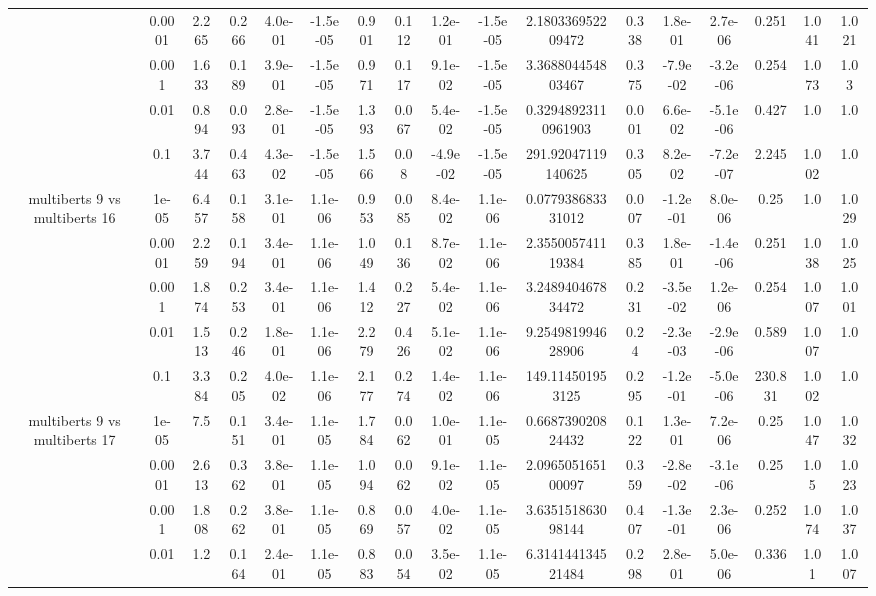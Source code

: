 \begin{tabular}{|c|c|c|c|c|c|c|c|c|c|c|c|c|c|c|c|c|}
 & 0.0001 & 2.265 & 0.266 & 4.0e-01 & -1.5e-05 & 0.901 & 0.112 & 1.2e-01 & -1.5e-05 & 2.180336952209472 & 0.338 & 1.8e-01 & 2.7e-06 & 0.251 & 1.041 & 1.021 \\
 & 0.001 & 1.633 & 0.189 & 3.9e-01 & -1.5e-05 & 0.971 & 0.117 & 9.1e-02 & -1.5e-05 & 3.368804454803467 & 0.375 & -7.9e-02 & -3.2e-06 & 0.254 & 1.073 & 1.03 \\
 & 0.01 & 0.894 & 0.093 & 2.8e-01 & -1.5e-05 & 1.393 & 0.067 & 5.4e-02 & -1.5e-05 & 0.32948923110961903 & 0.001 & 6.6e-02 & -5.1e-06 & 0.427 & 1.0 & 1.0 \\
 & 0.1 & 3.744 & 0.463 & 4.3e-02 & -1.5e-05 & 1.566 & 0.08 & -4.9e-02 & -1.5e-05 & 291.92047119140625 & 0.305 & 8.2e-02 & -7.2e-07 & 2.245 & 1.002 & 1.0 \\
\hline
\multirow{5}{*}{multiberts 9 vs multiberts 16} & 1e-05 & 6.457 & 0.158 & 3.1e-01 & 1.1e-06 & 0.953 & 0.085 & 8.4e-02 & 1.1e-06 & 0.077938683331012 & 0.007 & -1.2e-01 & 8.0e-06 & 0.25 & 1.0 & 1.029 \\
 & 0.0001 & 2.259 & 0.194 & 3.4e-01 & 1.1e-06 & 1.049 & 0.136 & 8.7e-02 & 1.1e-06 & 2.355005741119384 & 0.385 & 1.8e-01 & -1.4e-06 & 0.251 & 1.038 & 1.025 \\
 & 0.001 & 1.874 & 0.253 & 3.4e-01 & 1.1e-06 & 1.412 & 0.227 & 5.4e-02 & 1.1e-06 & 3.248940467834472 & 0.231 & -3.5e-02 & 1.2e-06 & 0.254 & 1.007 & 1.001 \\
 & 0.01 & 1.513 & 0.246 & 1.8e-01 & 1.1e-06 & 2.279 & 0.426 & 5.1e-02 & 1.1e-06 & 9.254981994628906 & 0.24 & -2.3e-03 & -2.9e-06 & 0.589 & 1.007 & 1.0 \\
 & 0.1 & 3.384 & 0.205 & 4.0e-02 & 1.1e-06 & 2.177 & 0.274 & 1.4e-02 & 1.1e-06 & 149.114501953125 & 0.295 & -1.2e-01 & -5.0e-06 & 230.831 & 1.002 & 1.0 \\
\hline
\multirow{5}{*}{multiberts 9 vs multiberts 17} & 1e-05 & 7.5 & 0.151 & 3.4e-01 & 1.1e-05 & 1.784 & 0.062 & 1.0e-01 & 1.1e-05 & 0.668739020824432 & 0.122 & 1.3e-01 & 7.2e-06 & 0.25 & 1.047 & 1.032 \\
 & 0.0001 & 2.613 & 0.362 & 3.8e-01 & 1.1e-05 & 1.094 & 0.062 & 9.1e-02 & 1.1e-05 & 2.096505165100097 & 0.359 & -2.8e-02 & -3.1e-06 & 0.25 & 1.05 & 1.023 \\
 & 0.001 & 1.808 & 0.262 & 3.8e-01 & 1.1e-05 & 0.869 & 0.057 & 4.0e-02 & 1.1e-05 & 3.635151863098144 & 0.407 & -1.3e-01 & 2.3e-06 & 0.252 & 1.074 & 1.037 \\
 & 0.01 & 1.2 & 0.164 & 2.4e-01 & 1.1e-05 & 0.883 & 0.054 & 3.5e-02 & 1.1e-05 & 6.314144134521484 & 0.298 & 2.8e-01 & 5.0e-06 & 0.336 & 1.01 & 1.007 \\

\end{tabular}
